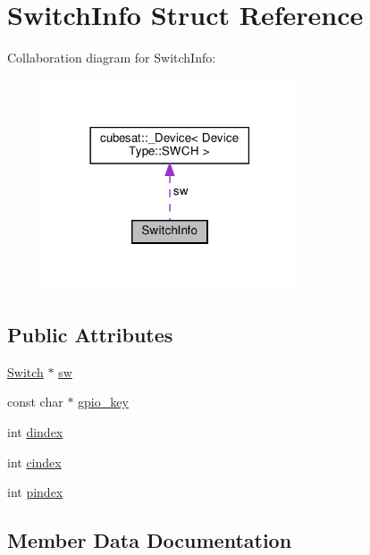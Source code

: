 \hypertarget{structSwitchInfo}{}\section{Switch\+Info Struct Reference}
\label{structSwitchInfo}


Collaboration diagram for Switch\+Info\+:\nopagebreak
\begin{figure}[H]
\begin{center}
\leavevmode
\includegraphics[width=213pt]{structSwitchInfo__coll__graph}
\end{center}
\end{figure}
\subsection*{Public Attributes}
\begin{DoxyCompactItemize}
\item 
\hyperlink{namespacecubesat_ac3cec22ee304129611eb1001b0fc5824}{Switch} $\ast$ \hyperlink{structSwitchInfo_a46a40920c06b4de39f14020d0dd5ba35}{sw}
\item 
const char $\ast$ \hyperlink{structSwitchInfo_a551cba470dd89e95902f84cef26b0412}{gpio\+\_\+key}
\item 
int \hyperlink{structSwitchInfo_a31bbae800a9455b20607c285e3dd5771}{dindex}
\item 
int \hyperlink{structSwitchInfo_a276e03abbb52bb859525fcc54a2948fa}{cindex}
\item 
int \hyperlink{structSwitchInfo_a60a1adfd5341d6514573d589a25b8e5f}{pindex}
\end{DoxyCompactItemize}


\subsection{Member Data Documentation}
\mbox{\label{structSwitchInfo_a276e03abbb52bb859525fcc54a2948fa}} 
